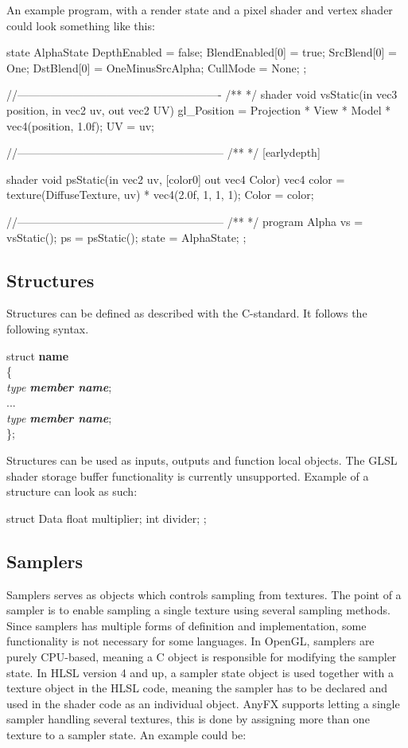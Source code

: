 \documentclass{article}
\newcommand{\SyntaxBox}[1]
{	
	\begin{center}
	\colorbox{orange!60}
	{
		\begin{minipage}{\linewidth}
		\hfill
		\begin{tabbing}
		#1
		\end{tabbing}
		\end{minipage}
	}
	\end{center}
}
\begin{document}
An example program, with a render state and a pixel shader and vertex shader could look something like this:
\begin{CodeBox}
state AlphaState
{
	DepthEnabled = false;
	BlendEnabled[0] = true;
	SrcBlend[0] = One;
	DstBlend[0] = OneMinusSrcAlpha;
	CullMode = None;
};

//-------------------------------------------------------
/**
*/
shader
void
vsStatic(in vec3 position, in vec2 uv, out vec2 UV)
{
	gl_Position = Projection * View * Model * vec4(position, 1.0f);
	UV = uv;
}

//--------------------------------------------------------
/**
*/
[earlydepth]

shader
void 
psStatic(in vec2 uv, [color0] out vec4 Color)
{
	vec4 color = texture(DiffuseTexture, uv) * vec4(2.0f, 1, 1, 1);
	Color =  color;
}

//--------------------------------------------------------
/**
*/
program Alpha
{
	vs = vsStatic();
	ps = psStatic();
	state = AlphaState;
};
\end{CodeBox}


\subsection{Structures}
Structures can be defined as described with the C-standard. It follows the following syntax.

\SyntaxBox
{
	struct \textbf{name} \\
	\{ \= \\
		\> \textit{type \textbf{member name}}; \\
		\>... \\
		\> \textit{type \textbf{member name}}; \\
	\};
}

Structures can be used as inputs, outputs and function local objects. The GLSL shader storage buffer functionality is currently unsupported. Example of a structure can look as such:

\begin{CodeBox}
struct Data
{
	float multiplier;
	int divider;
};
\end{CodeBox}

\subsection{Samplers}
Samplers serves as objects which controls sampling from textures. The point of a sampler is to enable sampling a single texture using several sampling methods. Since samplers has multiple forms of definition and implementation, some functionality is not necessary for some languages. In OpenGL, samplers are purely CPU-based, meaning a C object is responsible for modifying the sampler state. In HLSL version 4 and up, a sampler state object is used together with a texture object in the HLSL code, meaning the sampler has to be declared and used in the shader code as an individual object. AnyFX supports letting a single sampler handling several textures, this is done by assigning more than one texture to a sampler state. An example could be:
\end{document}
